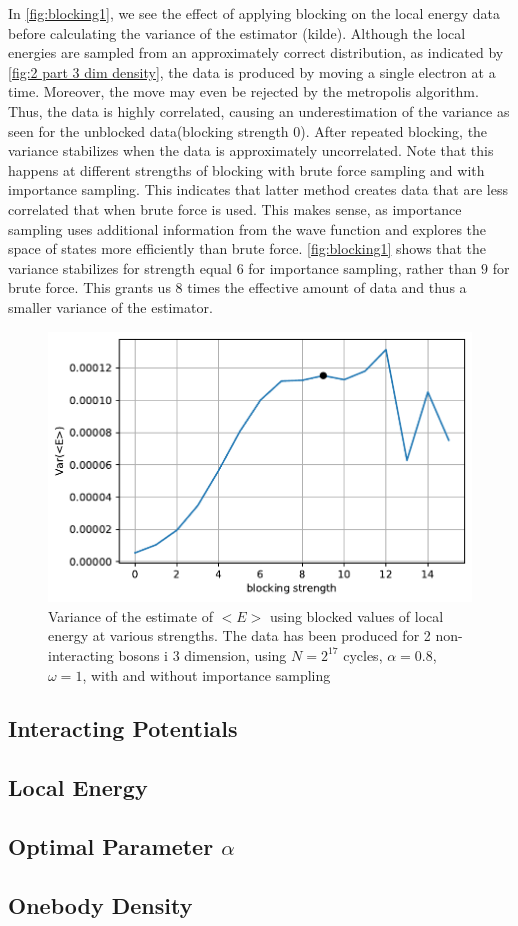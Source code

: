 In \autoref{fig:blocking1}, we see the effect of applying blocking on the local energy data before calculating the variance of the estimator (kilde). Although the local energies are sampled from an approximately correct distribution, as indicated by \autoref{fig:2 part 3 dim density}, the data is produced by moving a single electron at a time. Moreover, the move may even be rejected by the metropolis algorithm. Thus, the data is highly correlated, causing an underestimation of the variance as seen for the unblocked data(blocking strength $0$). After repeated blocking, the variance stabilizes when the data is approximately uncorrelated. Note that this happens at different strengths of blocking with brute force sampling and with importance sampling. This indicates that latter method creates data that are less correlated that when brute force is used. This makes sense, as importance sampling uses additional information from the wave function and explores the space of states more efficiently than brute force. \autoref{fig:blocking1} shows that the variance stabilizes for strength equal $6$ for importance sampling, rather than $9$ for brute force. This grants us 8 times the effective amount of data and thus a smaller variance of the estimator.

\begin{figure}
	\centering
	\includegraphics[width=.8\linewidth]{figures/blocking1.pdf}
	\caption{Variance of the estimate of $<E>$ using blocked values of local energy at various strengths. The data has been produced for 2 non-interacting bosons i 3 dimension, using $N = 2^{17}$ cycles, $\alpha = 0.8$, $\omega = 1$, with and without importance sampling}
	\label{fig:blocking3}
\end{figure}



\subsection{Interacting Potentials}
\subsection{Local Energy}
\subsection{Optimal Parameter \(\alpha\)}
\subsection{Onebody Density}

